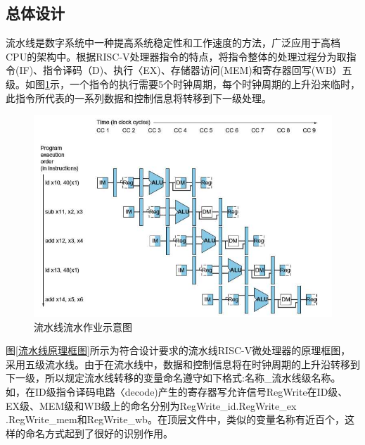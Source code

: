 \documentclass{../source/zjureport}
\begin{document}
        \subsection{总体设计}
        流水线是数字系统中一种提高系统稳定性和工作速度的方法，广泛应用于高档CPU的架构中。根据RISC-V处理器指令的特点，将指令整体的处理过程分为取指令(IF)、指令译码（D)、执行〈EX)、存储器访问(MEM)和寄存器回写(WB）五级。如图\ref{流水线流水作业示意图}示，一个指令的执行需要5个时钟周期，每个时钟周期的上升沿来临时，此指令所代表的一系列数据和控制信息将转移到下一级处理。
        \begin{figure}[H]
            \centering
            \includegraphics[]{figure/流水线流水作业示意图.jpg}
            \caption{流水线流水作业示意图}
            \label{流水线流水作业示意图}
        \end{figure}
        图\ref{流水线原理框图}所示为符合设计要求的流水线RISC-V微处理器的原理框图，采用五级流水线。由于在流水线中，数据和控制信息将在时钟周期的上升沿转移到下一级，所以规定流水线转移的变量命名遵守如下格式:名称_流水线级名称。如，在ID级指令译码电路〈decode)产生的寄存器写允许信号RegWrite在ID级、EX级、MEM级和WB级上的命名分别为RegWrite_id.RegWrite_ex .RegWrite_mem和RegWrite_wb。在顶层文件中，类似的变量名称有近百个，这样的命名方式起到了很好的识别作用。
\end{document}
